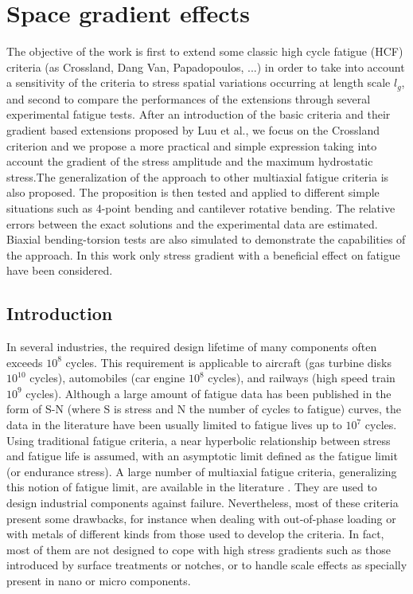 \documentclass[3p,times,procedia,number]{elsarticle}
\begin{document}
\section{Space gradient effects}

The objective of the work is first to extend some classic high cycle fatigue (HCF) criteria (as Crossland, Dang Van, Papadopoulos, ...) in order  to take into account a sensitivity of the criteria to stress spatial variations occurring at length scale $l_g$, and second to compare the performances of the extensions through several experimental fatigue tests. After an introduction of the basic criteria and their gradient based extensions proposed by Luu et al., we focus on the Crossland criterion and we  propose a more practical and simple expression taking into account the gradient of the stress amplitude and the maximum hydrostatic stress.The generalization of the approach to other multiaxial fatigue criteria is also proposed.  The proposition is then tested and applied to different simple situations such as 4-point bending and cantilever rotative bending.  The relative errors between the exact solutions and the experimental data are estimated. Biaxial  bending-torsion tests are also simulated to demonstrate the capabilities of the approach.  In this work only stress gradient with a beneficial effect on fatigue have been considered. %


\subsection{Introduction}

In several industries, the required design lifetime of many components often exceeds $ 10^8 $ cycles. This requirement is applicable to aircraft (gas turbine disks $ 10^{10} $ cycles), automobiles (car engine $ 10^8 $ cycles), and railways (high speed train $ 10^9 $ cycles). Although a large amount of fatigue data has been published in the form of S-N (where S is stress and N  the number of cycles to fatigue) curves, the data in the literature have been usually limited to fatigue lives up to $ 10^7 $ cycles. Using traditional fatigue criteria, a near hyperbolic relationship between stress and fatigue life is assumed, with an asymptotic limit defined as the fatigue limit (or endurance stress). 
A large number of multiaxial fatigue criteria, generalizing this notion of fatigue limit, are available in the literature \cite{Papadopoulos1997219}\cite{ballard1995high}\cite{suresh1998fatigue}. They are  used to design industrial components against failure. Nevertheless, most of these criteria present some drawbacks,  for instance when dealing with out-of-phase loading or with metals of different kinds from those used to develop the criteria. In fact, most of them are not designed to cope with high stress gradients such as those introduced  by surface treatments or notches, or to handle  scale effects as  specially present in nano or micro components. 
\end{document}
